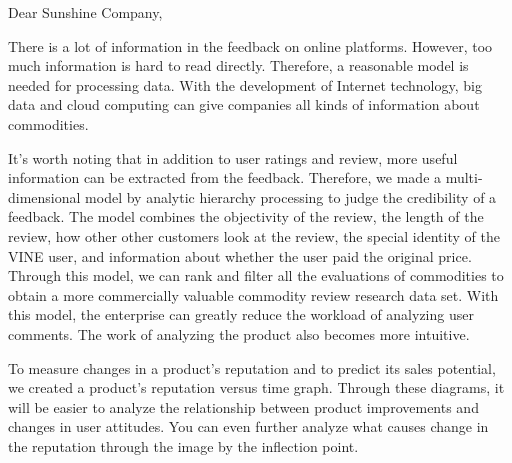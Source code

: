 \documentclass{mcmthesis}
\begin{document}
    \begin{letter}{Dear Sunshine Company, }
    

    There is a lot of information in the feedback on online platforms. However, too much information is hard to read directly. Therefore, a reasonable model is needed for processing data. With the development of Internet technology, big data and cloud computing can give companies all kinds of information about commodities.
    
    
    It's worth noting that in addition to user ratings and review, more useful information can be extracted from the feedback. Therefore, we made a multi-dimensional model by analytic hierarchy processing to judge the credibility of a feedback. The model combines the objectivity of the review, the length of the review, how other other customers look at the review, the special identity of the VINE user, and information about whether the user paid the original price. Through this model, we can rank and filter all the evaluations of commodities to obtain a more commercially valuable commodity review research data set. With this model, the enterprise can greatly reduce the workload of analyzing user comments. The work of analyzing the product also becomes more intuitive.
    
    To measure changes in a product's reputation and to predict its sales potential, we created a product's reputation versus time graph. Through these diagrams, it will be easier to analyze the relationship between product improvements and changes in user attitudes. You can even further analyze what causes change in the reputation through the image by the inflection point.
    

\end{letter}
\end{document}

